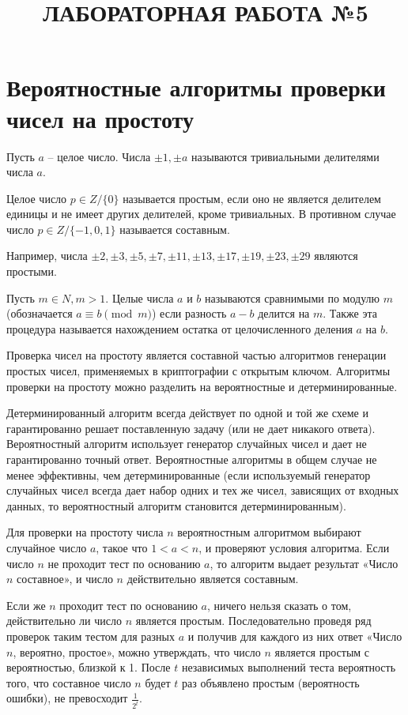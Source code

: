 \documentclass{article}
\begin{document}
\title{ЛАБОРАТОРНАЯ РАБОТА №5}
\author{}
\date{}
\maketitle

\section*{Вероятностные алгоритмы проверки чисел на простоту}

Пусть \( a \) – целое число. Числа \( \pm1, \pm a \) называются тривиальными делителями числа \( a \).

Целое число \( p \in Z / \{ 0 \} \) называется простым, если оно не является делителем единицы и не имеет других делителей, кроме тривиальных. В противном случае число \( p \in Z / \{-1, 0, 1\} \) называется составным.

Например, числа \( \pm2, \pm3, \pm5, \pm7, \pm11, \pm13, \pm17, \pm19, \pm23, \pm29 \) являются простыми.

Пусть \( m \in N, m > 1 \). Целые числа \( a \) и \( b \) называются сравнимыми по модулю \( m \) (обозначается \( a \equiv b \pmod{m} \)) если разность \( a - b \) делится на \( m \). Также эта процедура называется нахождением остатка от целочисленного деления \( a \) на \( b \).

Проверка чисел на простоту является составной частью алгоритмов генерации простых чисел, применяемых в криптографии с открытым ключом. Алгоритмы проверки на простоту можно разделить на вероятностные и детерминированные.

Детерминированный алгоритм всегда действует по одной и той же схеме и гарантированно решает поставленную задачу (или не дает никакого ответа). Вероятностный алгоритм использует генератор случайных чисел и дает не гарантированно точный ответ. Вероятностные алгоритмы в общем случае не менее эффективны, чем детерминированные (если используемый генератор случайных чисел всегда дает набор одних и тех же чисел, зависящих от входных данных, то вероятностный алгоритм становится детерминированным).

Для проверки на простоту числа \( n \) вероятностным алгоритмом выбирают случайное число \( a \), такое что \( 1 < a < n \), и проверяют условия алгоритма. Если число \( n \) не проходит тест по основанию \( a \), то алгоритм выдает результат «Число \( n \) составное», и число \( n \) действительно является составным.

Если же \( n \) проходит тест по основанию \( a \), ничего нельзя сказать о том, действительно ли число \( n \) является простым. Последовательно проведя ряд проверок таким тестом для разных \( a \) и получив для каждого из них ответ «Число \( n \), вероятно, простое», можно утверждать, что число \( n \) является простым с вероятностью, близкой к 1. После \( t \) независимых выполнений теста вероятность того, что составное число \( n \) будет \( t \) раз объявлено простым (вероятность ошибки), не превосходит \( \frac{1}{2^t} \).
\end{document}
